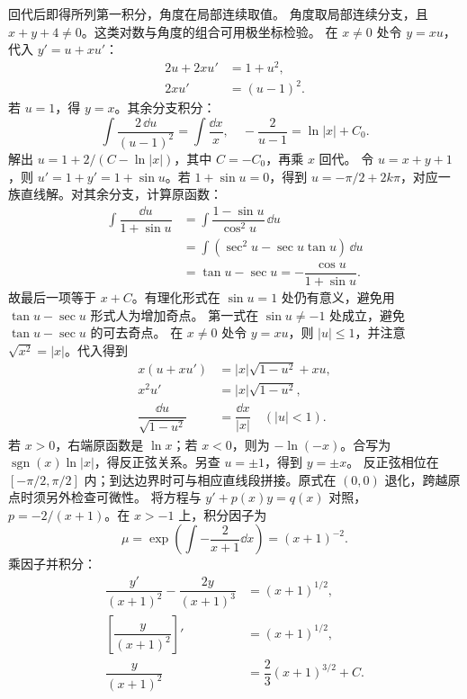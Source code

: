 回代后即得所列第一积分，角度在局部连续取值。
角度取局部连续分支，且 $x+y+4\ne0$。这类对数与角度的组合可用极坐标检验。
在 $x\ne0$ 处令 $y=xu$，代入 $y'=u+xu'$：
\[
\begin{aligned}
2u+2xu'&=1+u^2,\\
2xu'&=(u-1)^2.
\end{aligned}
\]
若 $u=1$，得 $y=x$。其余分支积分：
\[
\int\dfrac{2\,\dd u}{(u-1)^2}=\int\dfrac{\dd x}x,
\quad -\dfrac2{u-1}=\ln|x|+C_0.
\]
解出 $u=1+2/(C-\ln|x|)$，其中 $C=-C_0$，再乘 $x$ 回代。
令 $u=x+y+1$，则 $u'=1+y'=1+\sin u$。若 $1+\sin u=0$，得到 $u=-\pi/2+2k\pi$，对应一族直线解。对其余分支，计算原函数：
\[
\begin{aligned}
\int\dfrac{\dd u}{1+\sin u}
 &=\int\dfrac{1-\sin u}{\cos^2u}\,\dd u\\
 &=\int(\sec^2u-\sec u\tan u)\,\dd u\\
 &=\tan u-\sec u=-\dfrac{\cos u}{1+\sin u}.
\end{aligned}
\]
故最后一项等于 $x+C$。有理化形式在 $\sin u=1$ 处仍有意义，避免用 $\tan u-\sec u$ 形式人为增加奇点。
第一式在 $\sin u\ne-1$ 处成立，避免 $\tan u-\sec u$ 的可去奇点。
在 $x\ne0$ 处令 $y=xu$，则 $|u|\le1$，并注意 $\sqrt{x^2}=|x|$。代入得到
\[
\begin{aligned}
x(u+xu')&=|x|\sqrt{1-u^2}+xu,\\
x^2u'&=|x|\sqrt{1-u^2},\\
\dfrac{\dd u}{\sqrt{1-u^2}}&=\dfrac{\dd x}{|x|}\quad(|u|<1).
\end{aligned}
\]
若 $x>0$，右端原函数是 $\ln x$；若 $x<0$，则为 $-\ln(-x)$。合写为 $\operatorname{sgn}(x)\ln|x|$，得反正弦关系。另查 $u=\pm1$，得到 $y=\pm x$。
反正弦相位在 $[-\pi/2,\pi/2]$ 内；到达边界时可与相应直线段拼接。原式在 $(0,0)$ 退化，跨越原点时须另外检查可微性。
将方程与 $y'+p(x)y=q(x)$ 对照，$p=-2/(x+1)$。在 $x>-1$ 上，积分因子为
\[
\mu=\exp\left(\int-\dfrac2{x+1}\dd x\right)=(x+1)^{-2}.
\]
乘因子并积分：
\[
\begin{aligned}
\dfrac{y'}{(x+1)^2}-\dfrac{2y}{(x+1)^3}&=(x+1)^{1/2},\\
\left[\dfrac y{(x+1)^2}\right]'&=(x+1)^{1/2},\\
\dfrac y{(x+1)^2}&=\dfrac23(x+1)^{3/2}+C.
\end{aligned}
\]
